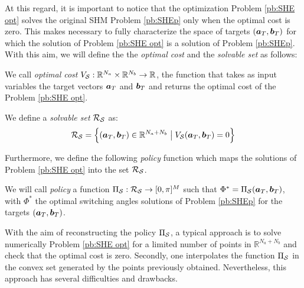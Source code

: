 \documentclass[twocolumn]{autart}    %
\begin{document}
At this regard, it is important to notice that the optimization Problem \ref{pb:SHE opt} solves the original SHM Problem \ref{pb:SHEp} only when the optimal cost is zero. This makes necessary to fully characterize the space of targets $(\bm{a}_T,\bm{b}_T)$ for which the solution of Problem \ref{pb:SHE opt} is a solution of Problem \ref{pb:SHEp}. With this aim, we will define the the \textit{optimal cost} and the \textit{solvable set} as follows:
\vspace{1em}
\begin{definition}
We call \emph{optimal cost} $V_{\mathcal{S}}:\mathbb{R}^{N_a}\times \mathbb{R}^{N_b} \rightarrow \mathbb{R}$, the function that takes as input variables the target vectors $\bm{a}_T$ and $\bm{b}_T$ and returns the optimal cost of the Problem \ref{pb:SHE opt}.
\end{definition}

\vspace{1em}
\begin{definition}
We define a \emph{solvable set} $\mathcal{R}_{\mathcal{S}}$ as:
\begin{gather}
	\mathcal{R}_{\mathcal{S}} = \Big\{ (\bm{a}_T,\bm{b}_T) \in \mathbb{R}^{N_a+N_b}\;\big|\; V_{\mathcal{S}}(\bm{a}_T,\bm{b}_T) = 0\Big\}
\end{gather}
\end{definition}

Furthermore, we define the following \textit{policy} function which maps the solutions of Problem \ref{pb:SHE opt} into the set $\mathcal{R}_{\mathcal{S}}$.

\vspace{1em}
\begin{definition}[Policy]\label{def:policy}
We will call \emph{policy} a function $\Pi_{\mathcal{S}}: \mathcal{R}_{\mathcal{S}} \rightarrow [0,\pi]^M$ such that $\Phi^* = \Pi_{\mathcal{S}}(\bm{a}_T,\bm{b}_T)$, with $\Phi^*$ the optimal switching angles solutions of Problem \ref{pb:SHEp} for the targets $(\bm{a}_T,\bm{b}_T)$.
\end{definition} 

With the aim of reconstructing the policy $\Pi_{\mathcal{S}}$, a typical approach is to solve numerically Problem \ref{pb:SHE opt} for a limited number of points in $\mathbb{R}^{N_a+N_b}$ and check that the optimal cost is zero. Secondly, one interpolates the function $\Pi_{\mathcal{S}}$ in the convex set generated by the points previously obtained. Nevertheless, this approach has several difficulties and drawbacks.
\end{document}
